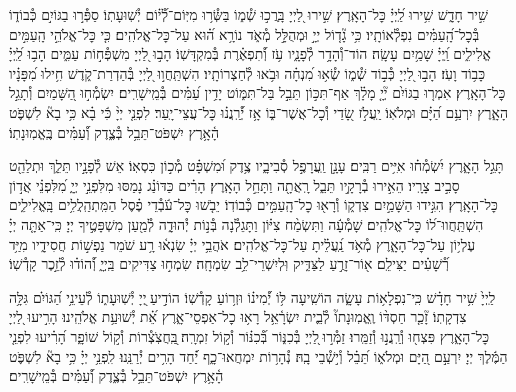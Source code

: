 \documentclass[twoside, openany, parskip=half, 11pt]{book}
\begin{document}
שִׁ֣יר חָדָ֑שׁ שִׁ֥ירוּ לַֽ֝יְיָ֗ כׇּל־הָאָֽרֶץ׃
שִׁ֣ירוּ לַ֭יְיָ בָּֽרֲכ֣וּ שְׁ֯מ֑וֹ בַּשְּׂ֯ר֥וּ מִיּֽוֹם־לְ֝֯י֗וֹם יְ֯שֽׁוּעָתֽוֹ׃
סַפְּ֯ר֣וּ בַגּוֹיִ֣ם כְּ֯בוֹד֑וֹ בְּ֯כׇל־הָֽ֝עַמִּ֗ים נִפְלְ֯אוֹתָֽיו׃
כִּ֥י גָ֘ד֤וֹל יְיָ֣ וּמְהֻלָּ֣ל מְ֯אֹ֑ד נוֹרָ֥א ה֝֗וּא עַל־כׇּל־אֱלֹהִֽים׃
כִּ֤י כׇּל־אֱלֹהֵ֣י הָֽעַמִּ֣ים אֱלִילִ֑ים וַֽ֝יְיָ֗ שָׁמַ֥יִם עָשָֽׂה׃
הוֹד־וְ֯הָדָ֥ר לְ֯פָנָ֑יו עֹ֥ז וְ֝֯תִפְאֶ֗רֶת בְּ֯מִקְדָּשֽׁוֹ׃
הָב֣וּ לַ֭יְיָ מִשְׁפְּ֯ח֣וֹת עַמִּ֑ים הָב֥וּ לַֽ֝יְיָ֗ כָּב֥וֹד וָעֹֽז׃
הָב֣וּ לַ֭יְיָ כְּ֯ב֣וֹד שְׁ֯מ֑וֹ שְׂ֯א֥וּ מִ֝נְחָ֗ה וּבֹ֥אוּ לְ֯חַצְרוֹתָֽיו׃
הִשְׁתַּֽחֲו֣וּ לַ֭יְיָ בְּ֯הַדְרַת־קֹ֑דֶשׁ חִ֥ילוּ מִ֝פָּנָ֗יו כׇּל־הָאָֽרֶץ׃
אִמְר֤וּ בַגּוֹיִ֨ם יְ֘יָ֤ מָלָ֗ךְ אַף־תִּכּ֣וֹן תֵּבֵ֣ל בַּל־תִּמּ֑וֹט יָדִ֥ין עַ֝מִּ֗ים בְּ֯מֵֽישָׁרִֽים׃
יִשְׂמְ֯ח֣וּ הַ֭שָּׁמַיִם וְ֯תָגֵ֣ל הָאָ֑רֶץ יִרְעַ֥ם הַ֝יָּ֗ם וּמְלֹאֽוֹ׃
יַֽעֲלֹ֣ז שָׂ֭דַי וְ֯כׇל־אֲשֶׁר־בּ֑וֹ אָ֥ז יְ֝֯רַֽנֲנ֗וּ כׇּל־עֲצֵי־יָֽעַר׃
לִפְנֵ֤י יְיָ֨ כִּ֬י בָ֗א כִּ֥י בָא֘ לִשְׁפֹּ֢ט הָ֫אָ֥רֶץ יִשְׁפֹּט־תֵּבֵ֥ל בְּ֯צֶ֑דֶק וְ֝֯עַמִּ֗ים בֶּֽאֱמֽוּנָתֽוֹ׃

תָּגֵ֣ל הָאָ֑רֶץ יִ֝שְׂמְ֯ח֗וּ אִיִּ֥ים רַבִּֽים׃
עָנָ֣ן וַֽעֲרָפֶ֣ל סְ֯בִיבָ֑יו צֶ֥דֶק וּ֝מִשְׁפָּ֗ט מְ֯כ֣וֹן כִּסְאֽוֹ׃
אֵשׁ לְ֯פָנָ֣יו תֵּלֵ֑ךְ וּתְלַהֵ֖ט סָבִ֣יב צָרָֽיו׃
הֵאִ֣ירוּ בְ֯רָקָ֣יו תֵּבֵ֑ל רָֽאֲתָ֖ה וַתָּחֵ֣ל הָאָֽרֶץ׃
הָרִ֗ים כַּדּוֹנַ֗ג נָמַסּוּ מִלִּפְנֵ֣י יְיָ֑ מִ֝לִּפְנֵ֗י אֲד֣וֹן כׇּל־הָאָֽרֶץ׃
הִגִּ֣ידוּ הַשָּׁמַ֣יִם צִדְק֑וֹ וְ֯רָא֖וּ כׇל־הָֽעַמִּ֣ים כְּ֯בוֹדֽוֹ׃
יֵבֹ֤שׁוּ כׇּל־עֹ֬בְ֯דֵי פֶ֗סֶל הַמִּֽתְהַֽלֲלִ֥ים בָּֽאֱלִילִ֑ים הִשְׁתַּֽחֲווּ־ל֝וֹ כׇּל־אֱלֹהִֽים׃
שָׁמְ֯עָ֬ה וַתִּשְׂמַ֨ח צִיּ֗וֹן וַתָּגֵלְ֯נָה בְּ֯נ֣וֹת יְ֯הוּדָ֑ה לְ֯מַ֖עַן מִשְׁפָּטֶ֣יךָ יְיָ׃
כִּֽי־אַתָּ֤ה יְיָ֗ עֶלְי֥וֹן עַל־כׇּל־הָאָ֑רֶץ מְ֯אֹ֥ד נַֽ֝עֲלֵ֗יתָ עַל־כׇּל־אֱלֹהִֽים׃
אֹהֲבֵ֥י יְיָ֗ שִׂנְא֫וּ רָ֥ע שֹׁמֵר נַפְשׁ֣וֹת חֲסִידָ֑יו מִיַּ֥ד רְ֝֯שָׁעִ֗ים יַצִּילֵֽם׃
א֖וֹר־זָרֻ֣עַ לַצַּדִּ֑יק וּֽלְיִשְׁרֵי־לֵ֥ב שִׂמְחָֽה׃
שִׂמְח֣וּ צַדִּיקִים בַּֽיְיָ֑ וְ֝֯הוֹד֗וּ לְ֯זֵ֣כֶר קָדְ֯שֽׁוֹ׃


לַֽיְיָ֙ שִׁ֥יר חָדָ֗שׁ כִּֽי־נִפְלָא֥וֹת עָשָׂ֑ה הוֹשִֽׁיעָה לּ֥וֹ יְ֝֯מִינ֗וֹ וּזְר֥וֹעַ קָדְ֯שֽׁוֹ׃
הוֹדִ֣יעַ ֖יְיָ יְ֯שֽׁוּעָת֑וֹ לְ֯עֵינֵ֥י הַ֝גּוֹיִ֗ם גִּלָּ֥ה צִדְקָתֽוֹ׃
זָ֘כַ֤ר חַסְדּ֨וֹ וֶֽאֱמֽוּנָתוֹ֘ לְ֯בֵ֢ית יִשְׂרָ֫אֵ֥ל רָא֥וּ כׇל־אַפְסֵי־אָ֑רֶץ אֵ֝֗ת יְ֯שׁוּעַ֥ת אֱלֹהֵֽינוּ׃
הָרִ֣יעוּ לַ֭יְיָ כׇּל־הָאָ֑רֶץ פִּצְח֖וּ וְ֯רַֽנֲנ֣וּ וְ֯זַמֵּֽרוּ׃
זַמְּ֯ר֣וּ ֖לַיְיָ בְּ֯כִנּ֑וֹר בְּ֝֯כִנּ֗וֹר וְ֯ק֣וֹל זִמְרָֽה׃
֖בַּֽחֲצֹֽצְ֯רוֹת וְ֯ק֣וֹל שׁוֹפָ֑ר הָ֝רִ֗יעוּ לִפְנֵ֤י הַמֶּ֬לֶךְ יְיָ׃
יִרְעַ֣ם הַ֭יָּם וּמְלֹא֑וֹ תֵּ֝בֵ֗ל וְ֯י֣שְׁ֯בֵי בָֽהּ׃
נְ֯הָר֥וֹת יִמְחֲאוּ־כָ֑ף יַ֝֗חַד הָרִ֥ים יְ֯רַנֵּֽנוּ׃
לִֽפְנֵ֥י יְיָ֗ כִּ֥י בָא֘ לִשְׁפֹּ֢ט הָ֫אָ֥רֶץ יִשְׁפֹּט־תֵּבֵ֥ל בְּ֯צֶ֑דֶק וְ֝֯עַמִּ֗ים בְּ֯מֵֽישָׁרִֽים׃
\end{document}
